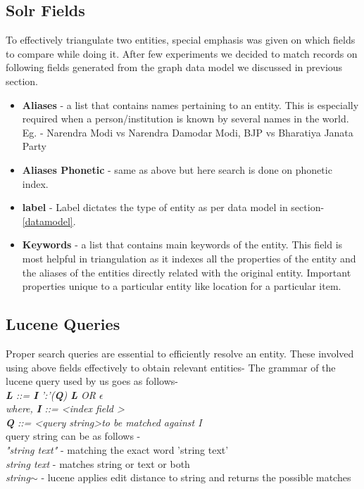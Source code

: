 \subsection{Solr Fields}
    To effectively triangulate two entities, special emphasis was given on which fields to compare while doing it. After few experiments we decided to match records on following fields generated from the graph data model we discussed in previous section.

\begin{itemize}
    \item \textbf{ Aliases }- a list that contains names pertaining to an entity. This is especially required when a person/institution is known by several names in the world. Eg. - Narendra Modi vs Narendra Damodar Modi, BJP vs Bharatiya Janata Party 
    \item \textbf{ Aliases  Phonetic } - same as above but here search is done on phonetic index.
    \item \textbf{ label } - Label dictates the type of entity as per data model in section- \ref{datamodel}.
    \item \textbf{ Keywords } - a list that contains main keywords of the entity. This field is most helpful in triangulation as it indexes all the properties of the entity and the aliases of the entities directly related with the original entity. Important properties unique to a particular entity like location for a particular item.
\end{itemize}

\subsection{Lucene Queries}
    Proper search queries are essential to efficiently resolve an entity. These involved using above fields effectively to obtain relevant entities- 
    The grammar of the lucene query used by us goes as follows-\\
        \emph{ \textbf{ L } ::=   \textbf{ I }':'(\textbf{Q}) \textbf{L}  OR $\epsilon$ } \\
       \emph{ where,  \textbf{I} ::= \textless index field \textgreater  }\\
        \emph{ \textbf{Q} ::= \textless query string\textgreater to be matched against I } \\

    query string can be as follows -\\
    
    \emph{ "string text" } - matching the exact word 'string text'\\
    \emph{ string text } - matches string or text or both \\
    \emph{ string$\sim$ } - lucene applies edit distance to string and returns the possible matches \\
    
